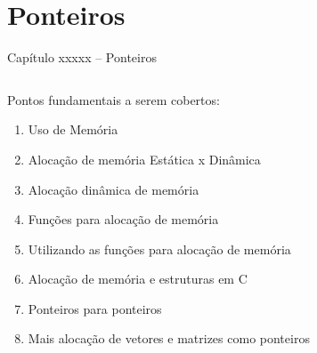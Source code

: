 

\section{Ponteiros}

\begin{frame}[c]{\Large Capítulo xxxxx -- Ponteiros}


\begin{columns}
\begin{column}{.5\textwidth}
\centering
Pontos fundamentais a serem cobertos:
  \begin{enumerate}
  \item Uso de Memória
  \item Alocação de memória Estática x Dinâmica
  \item Alocação dinâmica de memória
  \item  Funções para alocação de memória
  \item  Utilizando as funções para alocação de memória
  \item  Alocação de memória e estruturas em C
  \item  Ponteiros para ponteiros
  \item Mais alocação de vetores e matrizes como ponteiros
\end{enumerate}  

\end{column}
\begin{column}{.5\textwidth}
\centering
\end{column}
\end{columns}

\end{frame}

